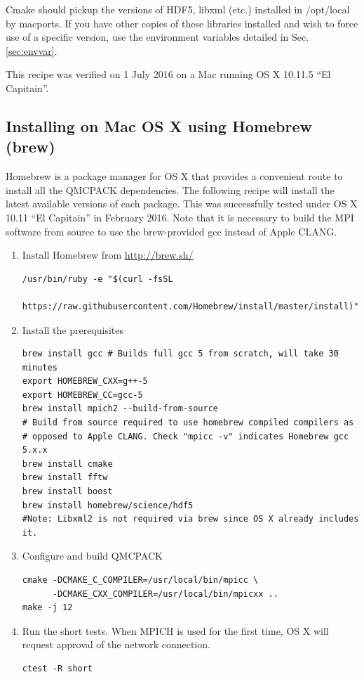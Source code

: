 Cmake should pickup the versions of HDF5, libxml (etc.) installed in
/opt/local by macports. If you have other copies of these libraries
installed and wish to force use of a specific version, use the
environment variables detailed in Sec. \ref{sec:envvar}.

This recipe was verified on 1 July 2016 on a Mac running OS X 10.11.5
``El Capitain''.

\subsection{Installing on Mac OS X using Homebrew (brew)}
Homebrew is a package manager for OS X that provides a convenient
route to install all the QMCPACK dependencies. The
following recipe will install the latest available versions of each
package. This was successfully tested under OS X 10.11 ``El
Capitain'' in February 2016. Note that it is necessary to build the MPI software from
source to use the brew-provided gcc instead of Apple CLANG.

\begin{enumerate}
\item Install Homebrew from \url{http://brew.sh/}
\begin{verbatim}
/usr/bin/ruby -e "$(curl -fsSL
    https://raw.githubusercontent.com/Homebrew/install/master/install)"
\end{verbatim}

\item Install the prerequisites
\begin{verbatim}
brew install gcc # Builds full gcc 5 from scratch, will take 30 minutes
export HOMEBREW_CXX=g++-5
export HOMEBREW_CC=gcc-5
brew install mpich2 --build-from-source
# Build from source required to use homebrew compiled compilers as
# opposed to Apple CLANG. Check "mpicc -v" indicates Homebrew gcc 5.x.x
brew install cmake
brew install fftw
brew install boost
brew install homebrew/science/hdf5
#Note: Libxml2 is not required via brew since OS X already includes it.
\end{verbatim}
\item Configure and build QMCPACK
\begin{verbatim}
cmake -DCMAKE_C_COMPILER=/usr/local/bin/mpicc \
      -DCMAKE_CXX_COMPILER=/usr/local/bin/mpicxx ..
make -j 12
\end{verbatim}
\item Run the short tests. When MPICH is used for the first time, OS
  X will request approval of the network connection.
\begin{verbatim}
ctest -R short
\end{verbatim}
\end{enumerate}

